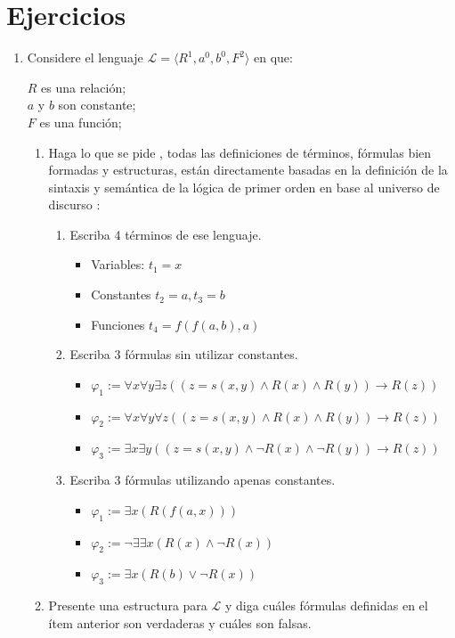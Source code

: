 \documentclass{article}
\begin{document}
	\section{Ejercicios}\label{sec:ejercicios}
	\begin{enumerate}

		\item Considere el lenguaje $\mathscr{L} = \langle  R^1, a^0, b^0, F^2 \rangle $ en que:
		
		$R$ es una relación; \\
		$a$ y $b$ son constante; \\
		$F$ es una función; \\
		\begin{enumerate}
		    \item Haga lo que se pide , todas las definiciones de términos, fórmulas bien formadas y estructuras, están directamente basadas en la definición de la sintaxis y semántica de la lógica de primer orden en base al universo de discurso \cite{huth2004logic}:
		    \begin{enumerate}
		        \item Escriba 4 términos de ese lenguaje.
		        \begin{itemize}
		            \item Variables: $t_1 = x$
		            \item Constantes $t_2 = a, t_3 = b$
		            \item Funciones $t_4 = f(f(a,b),a)$
		        \end{itemize}
		        \item Escriba 3 fórmulas sin utilizar constantes.
		            \begin{itemize}
		                \item $\varphi_1 := \forall x \forall y \exists z((z=s(x,y) \land R(x) \land R(y)) \to R(z))$
		                \item $\varphi_2 := \forall x \forall y \forall z((z=s(x,y) \land R(x) \land R(y)) \to R(z))$
		                \item $\varphi_3 := \exists x \exists y ((z=s(x,y) \land  \neg R(x) \land \neg R(y)) \to R(z))$
		            \end{itemize}
		        \item Escriba 3 fórmulas utilizando apenas constantes.
		            \begin{itemize}
		                \item $\varphi_1 := \exists x (R(f(a,x)))$
		                \item $\varphi_2 := 
		                \neg \exists ∃x(R(x) \land  \neg R(x))$
		                \item $\varphi_3 := 
		                \exists x(R(b) \lor \neg R(x))$
		            \end{itemize}
		    \end{enumerate}
		    \item Presente una estructura para $\mathscr{L}$ y diga cuáles fórmulas definidas en el ítem anterior son verdaderas y cuáles son falsas.
		    

\end{enumerate}
\end{enumerate}
\end{document}
